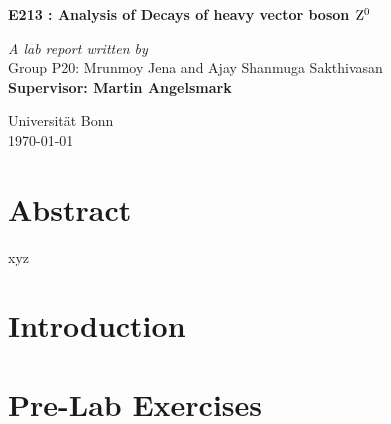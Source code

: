 \documentclass[a4paper]{report}
\begin{document}
\begin{onehalfspace}
\vspace*{0.5in}
\begin{center}
\begin{LARGE}
\textbf{E213 : Analysis of Decays of heavy vector boson $\rm Z^{0}$}\\ 
\end{LARGE}
\bigskip
\bigskip
\textit{A lab report written by}\\
Group P20: Mrunmoy Jena and Ajay Shanmuga Sakthivasan\\
\medskip
\textbf{Supervisor: Martin Angelsmark}\\
\vspace*{5in}
\begin{flushright}
Universit\"{a}t	Bonn\\
\today
\end{flushright}
\end{center}
\tableofcontents
\chapter*{Abstract}
xyz
\chapter*{Introduction}
%
\chapter*{Pre-Lab Exercises}

%
%
%

\end{onehalfspace}
\printbibliography
\end{document}

